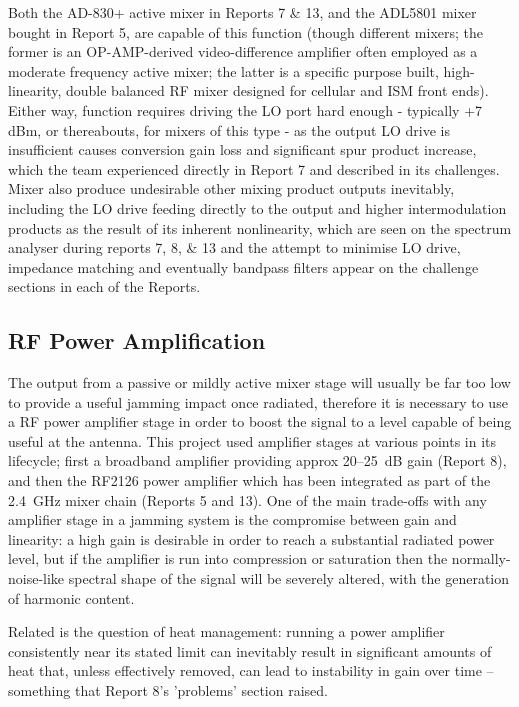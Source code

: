 \documentclass[12pt,a4paper]{report}
\begin{document}
	Both the AD-830+ active mixer in Reports 7 \& 13, and the ADL5801 mixer bought in Report 5, are capable of this function (though different mixers; the former is an OP-AMP-derived video-difference amplifier often employed as a moderate frequency active mixer; the latter is a specific purpose built, high-linearity, double balanced RF mixer designed for cellular and ISM front ends). Either way, function requires driving the LO port hard enough - typically +7 dBm, or thereabouts, for mixers of this type - as the output LO drive is insufficient causes conversion gain loss and significant spur product increase, which the team experienced directly in Report 7 and described in its challenges. Mixer also produce undesirable other mixing product outputs inevitably, including the LO drive feeding directly to the output and higher intermodulation products as the result of its inherent nonlinearity, which are seen on the spectrum analyser during reports 7, 8, \& 13 and the attempt to minimise LO drive, impedance matching and eventually bandpass filters appear on the challenge sections in each of the Reports.
	
	\subsection{RF Power Amplification}
	
	The output from a passive or mildly active mixer stage will usually be far too low to provide a useful jamming impact once radiated, therefore it is necessary to use a RF power amplifier stage in order to boost the signal to a level capable of being useful at the antenna. This project used amplifier stages at various points in its lifecycle; first a broadband amplifier providing approx 20--25~dB gain (Report 8), and then the RF2126 power amplifier which has been integrated as part of the 2.4~GHz mixer chain (Reports 5 and 13). One of the main trade-offs with any amplifier stage in a jamming system is the compromise between gain and linearity: a high gain is desirable in order to reach a substantial radiated power level, but if the amplifier is run into compression or saturation then the normally-noise-like spectral shape of the signal will be severely altered, with the generation of harmonic content. 
	
		
	Related is the question of heat management: running a power amplifier consistently near its stated limit can inevitably result in significant amounts of heat that, unless effectively removed, can lead to instability in gain over time -- something that Report 8's 'problems' section raised.
	
\end{document}
